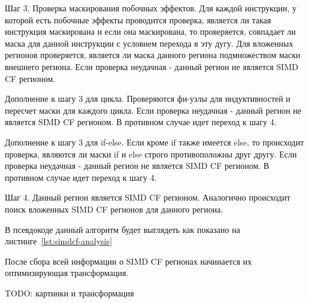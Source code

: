 Шаг 3. Проверка маскирования побочных эффектов. Для каждой инструкции, у которой
есть побочные эффекты проводится проверка, является ли такая инструкция
маскирована и если она маскирована, то проверяется, совпадает ли маска для
данной инструкции с условием перехода в эту дугу. Для вложенных регионов
проверяется, является ли маска данного региона подмножеством маски внешнего
региона. Если проверка неудачная - данный регион не является SIMD CF регионом.

Дополнение к шагу 3 для цикла. Проверяются фи-узлы для индуктивностей и пересчет
маски для каждого цикла. Если проверка неудачная - данный регион не является
SIMD CF регионом. В противном случае идет переход к шагу 4.

Дополнение к шагу 3 для if-else. Если кроме if также имеется else, то происходит
проверка, являются ли маски if и else строго противоположны друг другу. Если
проверка неудачная - данный регион не является SIMD CF регионом. В противном
случае идет переход к шагу 4.

Шаг 4. Данный регион является SIMD CF регионом. Аналогично происходит поиск
вложенных SIMD CF регионов для данного региона.

В псевдокоде данный алгоритм будет выглядеть как показано на листинге~\ref{lst:simdcf-analysis}

После сбора всей информации о SIMD CF регионах начинается их оптимизирующая трансформация.

TODO: картинки и трансформация
